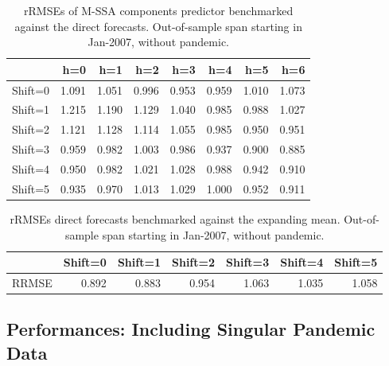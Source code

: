\documentclass[a4paper]{article}
\begin{document}
\begin{table}[ht]
\centering
\begin{tabular}{rrrrrrrr}
  \hline
 & h=0 & h=1 & h=2 & h=3 & h=4 & h=5 & h=6 \\ 
  \hline
Shift=0 & 1.091 & 1.051 & 0.996 & 0.953 & 0.959 & 1.010 & 1.073 \\ 
  Shift=1 & 1.215 & 1.190 & 1.129 & 1.040 & 0.985 & 0.988 & 1.027 \\ 
  Shift=2 & 1.121 & 1.128 & 1.114 & 1.055 & 0.985 & 0.950 & 0.951 \\ 
  Shift=3 & 0.959 & 0.982 & 1.003 & 0.986 & 0.937 & 0.900 & 0.885 \\ 
  Shift=4 & 0.950 & 0.982 & 1.021 & 1.028 & 0.988 & 0.942 & 0.910 \\ 
  Shift=5 & 0.935 & 0.970 & 1.013 & 1.029 & 1.000 & 0.952 & 0.911 \\ 
   \hline
\end{tabular}
\caption{rRMSEs of M-SSA components predictor benchmarked against the direct forecasts. Out-of-sample span starting in Jan-2007, without pandemic.} 
\label{rRMSE_mSSA_comp_direct_without_covid7}
\end{table}%
\begin{table}[ht]
\centering
\begin{tabular}{rrrrrrr}
  \hline
 & Shift=0 & Shift=1 & Shift=2 & Shift=3 & Shift=4 & Shift=5 \\ 
  \hline
RRMSE & 0.892 & 0.883 & 0.954 & 1.063 & 1.035 & 1.058 \\ 
   \hline
\end{tabular}
\caption{rRMSEs direct forecasts benchmarked against the expanding mean. Out-of-sample span starting in Jan-2007, without pandemic.} 
\label{rRMSE_mSSA_direct_mean_without_covid8}
\end{table}

\newpage
\subsection{Performances: Including Singular Pandemic Data}
\end{document}
